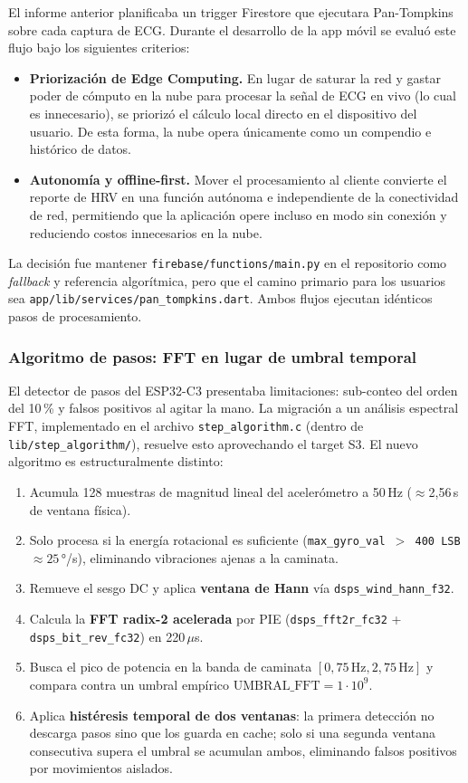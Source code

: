 \documentclass[letterpaper,11pt]{article}
\begin{document}
El informe anterior planificaba un trigger Firestore que ejecutara Pan-Tompkins sobre cada captura de ECG. Durante el desarrollo de la app móvil se evaluó este flujo bajo los siguientes criterios:
\begin{itemize}
    \item \textbf{Priorización de Edge Computing.} En lugar de saturar la red y gastar poder de cómputo en la nube para procesar la señal de ECG en vivo (lo cual es innecesario), se priorizó el cálculo local directo en el dispositivo del usuario. De esta forma, la nube opera únicamente como un compendio e histórico de datos.
    \item \textbf{Autonomía y offline-first.} Mover el procesamiento al cliente convierte el reporte de HRV en una función autónoma e independiente de la conectividad de red, permitiendo que la aplicación opere incluso en modo sin conexión y reduciendo costos innecesarios en la nube.
\end{itemize}

La decisión fue mantener \texttt{firebase/functions/main.py} en el repositorio como \textit{fallback} y referencia algorítmica, pero que el camino primario para los usuarios sea \texttt{app/lib/services/pan\_tompkins.dart}. Ambos flujos ejecutan idénticos pasos de procesamiento.

\subsubsection{Algoritmo de pasos: FFT en lugar de umbral temporal}

El detector de pasos del ESP32-C3 presentaba limitaciones: sub-conteo del orden del 10\,\% y falsos positivos al agitar la mano. La migración a un análisis espectral FFT, implementado en el archivo \texttt{step\_algorithm.c} (dentro de \texttt{lib/step\_algorithm/}), resuelve esto aprovechando el target S3. El nuevo algoritmo es estructuralmente distinto:
\begin{enumerate}
    \item Acumula 128 muestras de magnitud lineal del acelerómetro a 50\,Hz ($\approx$2,56\,s de ventana física).
    \item Solo procesa si la energía rotacional es suficiente (\texttt{max\_gyro\_val $>$ 400 LSB} $\approx 25$\,°/s), eliminando vibraciones ajenas a la caminata.
    \item Remueve el sesgo DC y aplica \textbf{ventana de Hann} vía \texttt{dsps\_wind\_hann\_f32}.
    \item Calcula la \textbf{FFT radix-2 acelerada} por PIE (\texttt{dsps\_fft2r\_fc32} + \texttt{dsps\_bit\_rev\_fc32}) en 220\,$\mu$s.
    \item Busca el pico de potencia en la banda de caminata $[0,75\,\text{Hz}, 2,75\,\text{Hz}]$ y compara contra un umbral empírico $\text{UMBRAL\_FFT} = 1\cdot10^9$.
    \item Aplica \textbf{histéresis temporal de dos ventanas}: la primera detección no descarga pasos sino que los guarda en cache; solo si una segunda ventana consecutiva supera el umbral se acumulan ambos, eliminando falsos positivos por movimientos aislados.
\end{enumerate}
\end{document}
